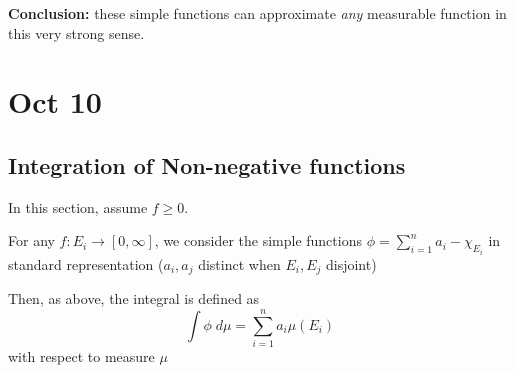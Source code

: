 \documentclass[12pt]{report}
\newcommand{\X}{\chi}
\begin{document}
    \textbf{Conclusion:} these simple functions can approximate \emph{any} measurable function in this very strong sense. 

\section{Oct 10}
\subsection*{Integration of Non-negative functions} 
    In this section, assume $f \geq 0$. 

    For any $f: E_i \to [0, \infty]$, we consider the simple functions $\phi = \sum_{i=1}^{n} a_i - \X_{E_i}$ in standard representation ($a_i, a_j$ distinct when $E_i, E_j$ disjoint) 

    Then, as above, the integral is defined as
    \[\int \phi \; d\mu = \sum_{i=1}^{n} a_i \mu(E_i)\]
    with respect to measure $\mu$
\end{document}
